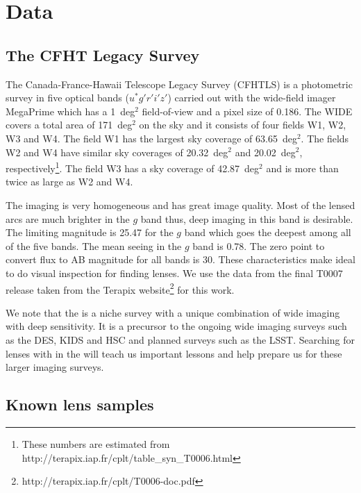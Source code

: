 \documentclass[useAMS,usenatbib,a4paper]{mn2e}
\begin{document}

\section{Data}
\label{sec:data}
\subsection{The CFHT Legacy Survey}
\label{sec:data:cfhtls}

The Canada-France-Hawaii Telescope Legacy Survey (CFHTLS) is a
photometric survey in five optical bands ($u^*g'r'i'z'$) carried out
with the wide-field imager MegaPrime which has a 1~deg$^2$ field-of-view
and a pixel size of 0.186\arcsec. The \cfhtls WIDE covers a total area
of 171~deg$^2$ on the sky and it consists of four fields W1, W2, W3 and
W4. The field W1 has the largest sky coverage of 63.65~deg$^2$. The
fields W2 and W4 have similar sky coverages of 20.32~deg$^2$ and
20.02~deg$^2$, respectively\footnote{These numbers are estimated from http://terapix.iap.fr/cplt/table\_syn\_T0006.html}.
The field W3 has a sky coverage of 42.87~deg$^2$ and is more than twice
as large as W2 and W4. 

The \cfhtls imaging is very homogeneous and has great image quality. Most of
the lensed arcs are much brighter in the $g$ band thus, deep imaging in
this band is desirable. The limiting magnitude is 25.47 for the $g$ band
which goes the deepest among all of the five bands. The mean seeing in
the $g$ band is 0.78\arcsec. The zero point to convert flux to AB
magnitude for all bands is 30. These characteristics make \cfhtls ideal
to do visual inspection for finding lenses.  We use the data from the
final T0007 release taken from the Terapix
website\footnote{{http://terapix.iap.fr/cplt/T0006-doc.pdf}}
for this work.

We note that the \cfhtls is a niche survey with a unique combination of
wide imaging with deep sensitivity. It is a precursor to the ongoing
wide imaging surveys such as the DES, KIDS and HSC and planned surveys
such as the LSST. Searching for lenses with \sw in the \cfhtls will
teach us important lessons and help prepare us for these larger imaging
surveys.




\subsection{Known \cfhtls lens samples}
\label{sec:data:kls}
\end{document}
